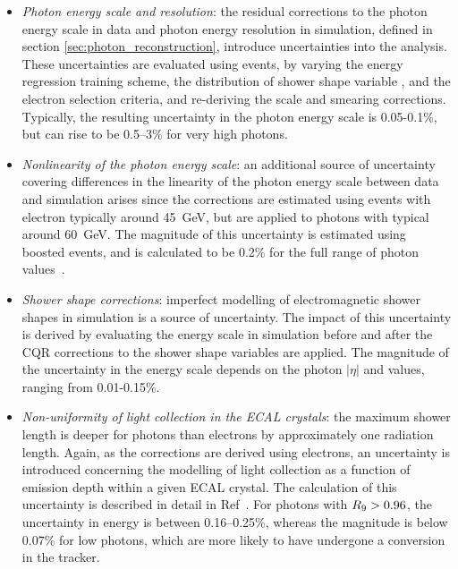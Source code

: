 \begin{itemize}
    \item \textit{Photon energy scale and resolution}: the residual corrections to the photon energy scale in data and photon energy resolution in simulation, defined in section \ref{sec:photon_reconstruction}, introduce uncertainties into the analysis. These uncertainties are evaluated using \Zee events, by varying the energy regression training scheme, the distribution of shower shape variable \RNINE, and the electron selection criteria, and re-deriving the scale and smearing corrections. Typically, the resulting uncertainty in the photon energy scale is 0.05-0.1\%, but can rise to be 0.5--3\% for very high \pt photons.
    
    \item \textit{Nonlinearity of the photon energy scale}: an additional source of uncertainty covering differences in the linearity of the photon energy scale between data and simulation arises since the corrections are estimated using \Zee events with electron \pt typically around 45~GeV, but are applied to photons with typical \pt around 60~GeV. The magnitude of this uncertainty is estimated using boosted \Zee events, and is calculated to be 0.2\% for the full range of photon \pt values~\cite{Khachatryan:2014ira}.
    
    \item \textit{Shower shape corrections}: imperfect modelling of electromagnetic shower shapes in simulation is a source of uncertainty. The impact of this uncertainty is derived by evaluating the energy scale in simulation before and after the CQR corrections to the shower shape variables are applied. The magnitude of the uncertainty in the energy scale depends on the photon $|\eta|$ and \RNINE values, ranging from 0.01-0.15\%.
    
    \item \textit{Non-uniformity of light collection in the ECAL crystals}: the maximum shower length is deeper for photons than electrons by approximately one radiation length. Again, as the corrections are derived using electrons, an uncertainty is introduced concerning the modelling of light collection as a function of emission depth within a given ECAL crystal. The calculation of this uncertainty is described in detail in Ref~\cite{Sirunyan:2020xwk}. For photons with $R_9 > 0.96$, the uncertainty in energy is between 0.16--0.25\%, whereas the magnitude is below 0.07\% for low \RNINE photons, which are more likely to have undergone a conversion in the tracker.
    

\end{itemize}
